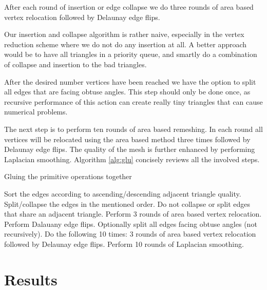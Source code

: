 \documentclass[letter,11pt]{article}
\begin{document}
After each round of insertion or edge collapse we do three rounds of
area based vertex relocation followed by Delaunay edge flips.

Our insertion and collapse algorithm is rather naive, especially in
the vertex reduction scheme where we do not do any insertion at all. A
better approach would be to have all triangles in a priority queue,
and smartly do a combination of collapse and insertion to the bad
triangles.

After the desired number vertices have been reached we have the option
to split all edges that are facing obtuse angles. This step should
only be done once, as recursive performance of this action can create
really tiny triangles that can cause numerical problems.

The next step is to perform ten rounds of area based remeshing. In each
round all vertices will be relocated using the area based method three
times followed by Delaunay edge flips. The quality of the mesh is
further enhanced by performing Laplacian smoothing. Algorithm
\ref{alg:glu} concisely reviews all the involved steps.

\begin{algorithm}
  \caption{Gluing the primitive operations together}
  \label{alg:glu}
  \begin{algorithmic}[1]
    
    \State Sort the edges according to ascending/descending adjacent
    triangle quality.
    \State Split/collapse the edges in the mentioned order. 
    \State Do not collapse or split edges that share an adjacent triangle.
    \State Perform 3 rounds of area based vertex relocation.
    \State Perform Dalauany edge flips.
    \EndWhile
    \State Optionally split all edges facing obtuse angles (not recursively).
    \State Do the following 10 times: 3 rounds of area based vertex relocation
    followed by Delaunay edge flips.
    \State Perform 10 rounds of Laplacian smoothing.
  \end{algorithmic}
\end{algorithm}

\section*{Results}
\end{document}
